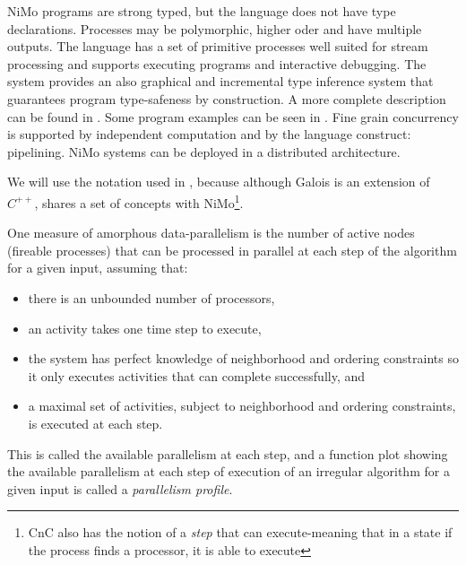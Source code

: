 \documentclass{article}                     \usepackage{graphics}
\begin{document}
  NiMo programs are strong typed,  but the language does not have type declarations. Processes may be  polymorphic, higher oder and have multiple outputs. The language has a set of primitive processes well suited for stream processing and supports  executing  programs and interactive debugging. The system provides an also graphical and incremental type inference system that guarantees program type-safeness by construction. A more complete description can be found in \cite{art-revista}. Some program examples can be seen in \cite{nimo-home}.  Fine grain  concurrency is supported by independent computation and  by the  language construct: pipelining. NiMo systems can be deployed in a distributed architecture.
 




 






























We will use the notation used in \cite{galois}, because although Galois is an extension of $C^{++}$, shares a set of concepts with NiMo\footnote{CnC also has the notion of a \textit{step} that can execute-meaning that in a state   if the process  finds a processor, it is able to execute}.

 One measure of amorphous data-parallelism is
the number of active nodes (fireable processes)  that can be processed in parallel at each
step of the algorithm for a given input, assuming that:
\begin{itemize}
\item  there is an unbounded number of processors, 
\item  an activity takes one time step to execute, 
\item  the system has perfect knowledge of neighborhood and ordering constraints so it only executes activities that can
complete successfully, and 
\item a maximal set of activities, subject to neighborhood and ordering constraints, is executed at each step.
\end{itemize}
This is called the available parallelism at each step, and a function plot showing the available parallelism at each step of execution of
an irregular algorithm for a given input is called a \textit{parallelism profile}.
\end{document}
